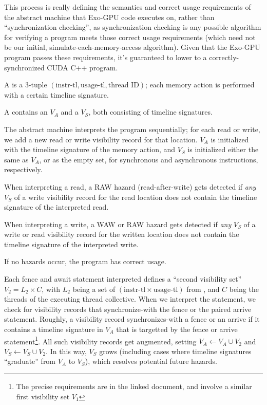 \filbreak
This process is really defining the semantics and correct usage requirements of the abstract machine that Exo-GPU code executes on, rather than ``synchronization checking'', as synchronization checking is any possible algorithm for verifying a program meets those correct usage requirements (which need not be our initial, simulate-each-memory-access algorithm).
Given that the Exo-GPU program passes these requirements, it's guaranteed to lower to a correctly-synchronized CUDA C++ program.

\filbreak
A  is a 3-tuple $(\text{instr-tl}, \text{usage-tl}, \text{thread ID})$; each memory action is performed with a certain timeline signature.

\filbreak  
A  contains an  $V_A$ and a  $V_S$, both consisting of timeline signatures.

\filbreak
The abstract machine interprets the program sequentially; for each read or write, we add a new read or write visibility record for that location.
$V_A$ is initialized with the timeline signature of the memory action, and $V_S$ is initialized either the same as $V_A$, or as the empty set, for synchronous and asynchronous instructions, respectively.

\filbreak
When interpreting a read, a RAW hazard (read-after-write) gets detected if \textit{any} $V_S$ of a write visibility record for the read location does not contain the timeline signature of the interpreted read.

\filbreak
When interpreting a write, a WAW or RAW hazard gets detected if \textit{any} $V_S$ of a write or read visibility record for the written location does not contain the timeline signature of the interpreted write.

\filbreak
If no hazards occur, the program has correct usage.

\filbreak
Each fence and await statement interpreted defines a ``second visibility set'' $V_2 = L_2 \times C$, with $L_2$ being a set of $(\text{instr-tl} \times \text{usage-tl})$ from , and $C$ being the threads of the executing thread collective.
When we interpret the statement, we check for visibility records that synchronize-with the fence or the paired arrive statement.
Roughly, a visibility record synchronizes-with a fence or an arrive if it contains a timeline signature in $V_A$ that is targetted by the fence or arrive statement\footnote{The precise requirements are in the linked document, and involve a similar first visibility set $V_1$}.
All such visibility records get augmented, setting $V_A \leftarrow V_A \cup V_2$ and $V_S \leftarrow V_S \cup V_2$.
In this way, $V_S$ grows (including cases where timeline signatures ``graduate'' from $V_A$ to $V_S$), which resolves potential future hazards.

